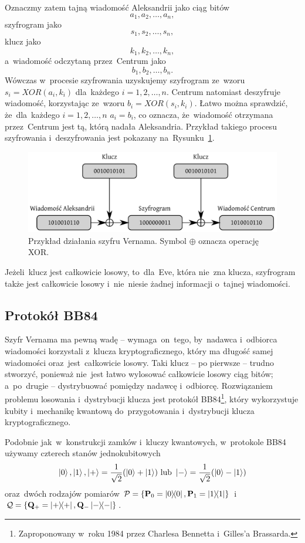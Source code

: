 Oznaczmy zatem tajną wiadomość Aleksandrii jako ciąg bitów $$a_1, a_2, \ldots, a_n,$$
szyfrogram jako $$s_1, s_2, \ldots, s_n,$$ klucz jako $$k_1, k_2,
	\ldots, k_n,$$ a~wiadomość odczytaną przez~Centrum jako $$b_1, b_2, \ldots, b_n.$$
Wówczas w~procesie szyfrowania uzyskujemy szyfrogram ze~wzoru $s_i=XOR(a_i, k_i)$ dla~każdego
$i=1,2,\ldots,n$. Centrum natomiast deszyfruje wiadomość, korzystając ze~wzoru
$b_i=XOR(s_i, k_i)$. Łatwo można sprawdzić, że~dla~każdego $i=1,2,\ldots,n$ $a_i
	= b_i$, co oznacza, że~wiadomość otrzymana przez~Centrum jest tą, którą nadała Aleksandria.
Przykład takiego procesu szyfrowania i~deszyfrowania jest pokazany na~Rysunku~\ref{rys:vernam}.

\begin{figure}[h]
	\centering
	\includegraphics[width=0.7\linewidth]{pics/vernam}
	\caption{Przykład działania szyfru Vernama. Symbol $\oplus$ oznacza operację XOR.}
	\label{rys:vernam}
\end{figure}

Jeżeli~klucz jest całkowicie losowy, to~dla~Eve, która nie~zna klucza, szyfrogram
także jest całkowicie losowy i~nie~niesie żadnej informacji o~tajnej wiadomości.

\subsection{Protokół BB84}
Szyfr Vernama ma pewną wadę -- wymaga~on~tego, by~nadawca i~odbiorca wiadomości
korzystali z~klucza kryptograficznego, który ma długość samej wiadomości oraz~jest~całkowicie
losowy. Taki klucz -- po pierwsze -- trudno stworzyć, ponieważ nie~jest łatwo
wylosować całkowicie losowy ciąg bitów; a~po~drugie -- dystrybuować pomiędzy
nadawcę i~odbiorcę. Rozwiązaniem
problemu losowania i~dystrybucji klucza jest protokół
BB84\footnote{Zaproponowany w~roku 1984 przez Charlesa Bennetta i~Gilles'a
	Brassarda.}, który wykorzystuje kubity i~mechanikę kwantową
do~przygotowania i~dystrybucji klucza kryptograficznego.

Podobnie jak~w~konstrukcji zamków i~kluczy kwantowych, w~protokole BB84 używamy
czterech stanów jednokubitowych
$$
	\ket{0}, \ket{1}, \ket{+}=\frac{1}{\sqrt{2}}(\ket{0}+\ket{1})
	\text{ lub } \ket{-}=\frac{1}{\sqrt{2}}(\ket{0}-\ket{1})
$$
oraz~dwóch rodzajów pomiarów
$\mathcal{P}=\{\mathbf{P}_0=\ketbra{0}{0}, \mathbf{P}_1=\ketbra{1}{1}\}$ i
$\mathcal{Q}=\{\mathbf{Q}_+=\ketbra{+}{+}, \mathbf{Q}_-\ketbra{-}{-}\}$.

